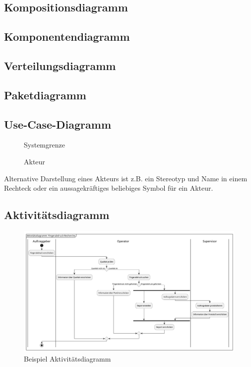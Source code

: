 \subsection{Kompositionsdiagramm}

\subsection{Komponentendiagramm}

\subsection{Verteilungsdiagramm}

\subsection{Paketdiagramm}

\subsection{Use-Case-Diagramm}

\begin{figure}[H]
    \centering
    
    \caption{Systemgrenze}
\end{figure}
\FloatBarrier

\begin{figure}[H]
    \centering
    
    \caption{Akteur}
\end{figure}
\FloatBarrier

Alternative Darstellung eines Akteurs ist z.B. ein Stereotyp und Name in einem Rechteck oder ein aussagekräftiges beliebiges Symbol für ein Akteur.

\subsection{Aktivitätsdiagramm}

\begin{figure}[H]
    \centering
    \includegraphics[width=\textwidth]{figures/activity.png}
    \caption{Beispiel Aktivitätsdiagramm}
\end{figure}

